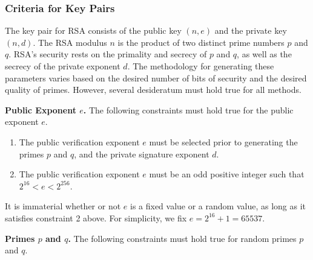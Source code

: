 \documentclass[letterpaper]{article}
\begin{document}
\subsubsection{Criteria for Key Pairs}\label{sec:keygen}

The key pair for RSA consists of the public key $(n, e)$ and the private key $(n, d)$. The RSA modulus $n$ is the product of two distinct prime numbers $p$ and $q$. RSA's security rests on the primality and secrecy of $p$ and $q$, as well as the secrecy of the private exponent $d$. The methodology for generating these parameters varies based on the desired number of bits of security and the desired quality of primes. However, several desideratum must hold true for all
methods.\newline

\noindent \textbf{Public Exponent $e$.} The following constraints must hold true for the public exponent $e$.
\begin{enumerate}
    \item The public verification exponent $e$ must be selected prior to generating the primes $p$ and $q$, and the private signature exponent $d$.

    \item The public verification exponent $e$ must be an odd positive integer such that $2^{16} < e < 2^{256}$.

\end{enumerate}

It is immaterial whether or not $e$ is a fixed value or a random value, as long as it satisfies constraint 2 above. For simplicity, we fix $e = 2^{16} + 1 = 65537$.\newline

\noindent \textbf{Primes $p$ and $q$.} The following constraints must hold true for random primes $p$ and $q$.
\end{document}
